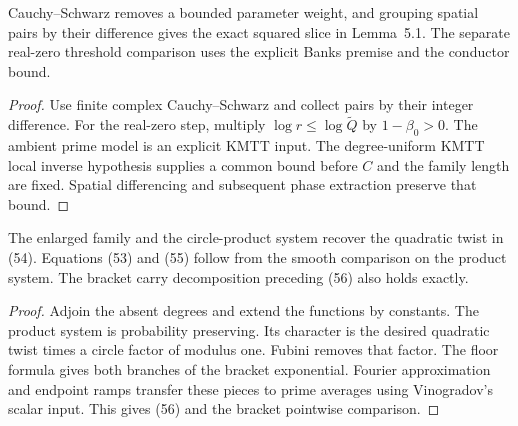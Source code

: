 \begin{lemma}\label{checked-difference}
\leanok
Cauchy--Schwarz removes a bounded parameter weight, and grouping
spatial pairs by their difference gives the exact squared slice
in Lemma~5.1. The separate real-zero threshold comparison uses
the explicit Banks premise and the conductor bound.
\end{lemma}
\begin{proof}
\leanok
Use finite complex Cauchy--Schwarz and collect pairs by their
integer difference. For the real-zero step, multiply
$\log r\leq\log\widetilde Q$ by $1-\beta_0>0$.
The ambient prime model is an explicit KMTT input. The degree-uniform
KMTT local inverse hypothesis supplies a common bound before $C$ and
the family length are fixed. Spatial differencing and subsequent
phase extraction preserve that bound.
\end{proof}

\begin{lemma}\label{checked-rotations}
\leanok
The enlarged family and the circle-product system recover the
quadratic twist in (54). Equations (53) and (55) follow from
the smooth comparison on the product system. The bracket
carry decomposition preceding (56) also holds exactly.
\end{lemma}
\begin{proof}
\leanok
Adjoin the absent degrees and extend the functions by constants.
The product system is probability preserving. Its character
is the desired quadratic twist times a circle factor of modulus
one. Fubini removes that factor. The floor formula gives both
branches of the bracket exponential. Fourier approximation and
endpoint ramps transfer these pieces to prime averages using
Vinogradov's scalar input. This gives (56) and the bracket
pointwise comparison.
\end{proof}


